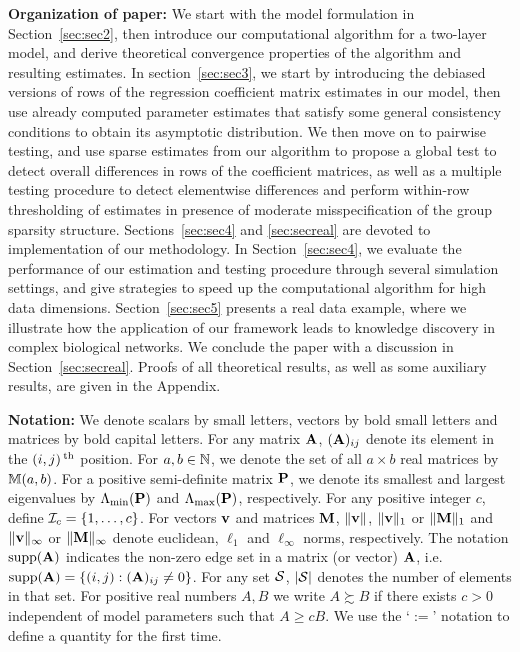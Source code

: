 \noindent
\textbf{Organization of paper:}
We start with the model formulation in Section~\ref{sec:sec2}, then introduce our computational algorithm for a two-layer model, and derive theoretical convergence properties of the algorithm and resulting estimates. In section~\ref{sec:sec3}, we start by introducing the debiased versions of rows of the regression coefficient matrix estimates in our model, then use already computed parameter estimates that satisfy some general consistency conditions to obtain its asymptotic distribution. We then move on to pairwise testing, and use sparse estimates from our algorithm to propose a global test to detect overall differences in rows of the coefficient matrices, as well as a multiple testing procedure to detect elementwise differences and perform within-row thresholding of estimates in presence of moderate misspecification of the group sparsity structure. Sections~\ref{sec:sec4} and \ref{sec:secreal} are devoted to implementation of our methodology. In Section~\ref{sec:sec4}, we evaluate the performance of our estimation and testing procedure through several simulation settings, and give strategies to speed up the computational algorithm for high data dimensions. Section~\ref{sec:sec5} presents a real data example, where we illustrate how the application of our framework leads to knowledge discovery in complex biological networks. We conclude the paper with a discussion in Section~\ref{sec:secreal}. Proofs of all theoretical results, as well as some auxiliary results, are given in the Appendix.

\noindent
\textbf{Notation:}
We denote scalars by small letters, vectors by bold small letters and matrices by bold capital letters. For any matrix ${\mathbf{A}}$, $({\mathbf{A}})_{ij}$ denote its element in the $(i,j)\operatorname*{^{\text{th}}}$ position. For $a,b \in {\mathbb{N}}$, we denote the set of all $a \times b$ real matrices by ${\mathbb{M}}(a,b)$. For a positive semi-definite matrix ${\mathbf{P}}$, we denote its smallest and largest eigenvalues by $\Lambda_{\min} ({\mathbf{P}})$ and $\Lambda_{\max} ({\mathbf{P}})$, respectively. For any positive integer $c$, define ${\cal{I}}_c = \{ 1, \ldots, c\}$. For vectors ${\bf{v}}$ and matrices ${\mathbf{M}}$, $\| {\bf{v}} \|$, $\|{\bf{v}} \|_1$ or $\|{\mathbf{M}} \|_1$ and $\|{\bf{v}} \|_\infty$ or $\|{\mathbf{M}} \|_\infty$ denote euclidean, $\ell_1$ and $\ell_\infty$ norms, respectively. The notation $\operatorname*{supp}({\mathbf{A}})$ indicates the non-zero edge set in a matrix (or vector) ${\mathbf{A}}$, i.e. $\operatorname*{supp}({\mathbf{A}}) = \{(i,j): ({\mathbf{A}})_{ij} \neq 0\}$. For any set ${\cal{S}}$, $| {\cal{S}}|$ denotes the number of elements in that set. For positive real numbers $A, B$ we write $A \succsim B$ if there exists $c>0$ independent of model parameters such that $A \geq cB$. We use the `$:=$' notation to define a quantity for the first time.